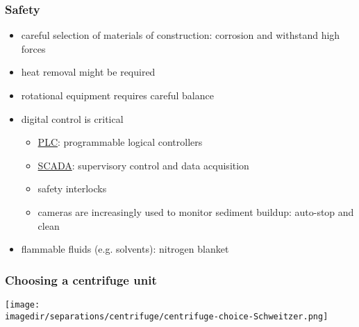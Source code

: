 \begin{comment}
\begin{frame}\frametitle{Design}
	Fixed vs swing out: different energy use profiles
	Fixed: heavy???
	Swing out rotors: cells, course particles
\end{frame}

\begin{frame}\frametitle{Svedberg S-value?}
	What is it;
	how is it calculated?
\end{frame}

\begin{frame}\frametitle{Ultracentrifuges}
	* Biological cell constituents, macromolecules
	* Instrumented to measure progress of the separation: sedFIT software
\end{frame}

\begin{frame}\frametitle{Differential centrifugation}
	http://www.coleparmer.com/TechLibraryArticle/30
\end{frame}

\end{comment}

\begin{frame}\frametitle{Safety}
	\begin{itemize}
		\item	careful selection of materials of construction: corrosion and withstand high forces
		\item	heat removal might be required
		\item	rotational equipment requires careful balance
		\item	digital control is critical
		\begin{itemize}
			\item	\href{http://en.wikipedia.org/wiki/Programmable_logic_controller}{PLC}: programmable logical controllers 
			\item	\href{http://en.wikipedia.org/wiki/SCADA}{SCADA}: supervisory control and data acquisition
			\item	safety interlocks
			\item	cameras are increasingly used to monitor sediment buildup: auto-stop and clean
		\end{itemize} 
		\item	flammable fluids (e.g. solvents): nitrogen blanket
	\end{itemize}
\end{frame}

\begin{frame}\frametitle{Choosing a centrifuge unit}
	\begin{center}
		\texttt{[image: \\imagedir/separations/centrifuge/centrifuge-choice-Schweitzer.png]}
	\end{center}
\end{frame}

